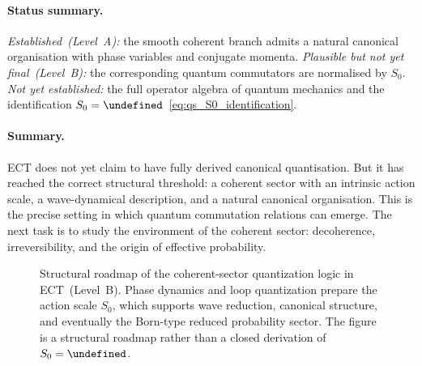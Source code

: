 \documentclass[11pt,a4paper]{article}
\let\hbar\undefined
\numberwithin{equation}{section}
\begin{document}
\paragraph{Status summary.}
\textit{Established~(Level~A):}
the smooth coherent branch admits a natural canonical organisation with
phase variables and conjugate momenta.
\textit{Plausible but not yet final~(Level~B):}
the corresponding quantum commutators are normalised by $S_0$.
\textit{Not yet established:}
the full operator algebra of quantum mechanics and the identification
$S_0=\hbar$~\eqref{eq:qs_S0_identification}.

\paragraph{Summary.}
ECT does not yet claim to have fully derived canonical quantisation.
But it has reached the correct structural threshold: a coherent sector
with an intrinsic action scale, a wave-dynamical description, and a
natural canonical organisation.
This is the precise setting in which quantum commutation relations can
emerge.
The next task is to study the environment of the coherent sector:
decoherence, irreversibility, and the origin of effective probability.

\begin{figure}[h]
\centering
{}
\caption{Structural roadmap of the coherent-sector quantization logic
in ECT~(Level~B).
Phase dynamics and loop quantization prepare the action scale $S_0$,
which supports wave reduction, canonical structure, and eventually the
Born-type reduced probability sector.
The figure is a structural roadmap rather than a closed derivation
of $S_0=\hbar$.}
\label{fig:qs_quantization_chain}
\end{figure}
\end{document}
